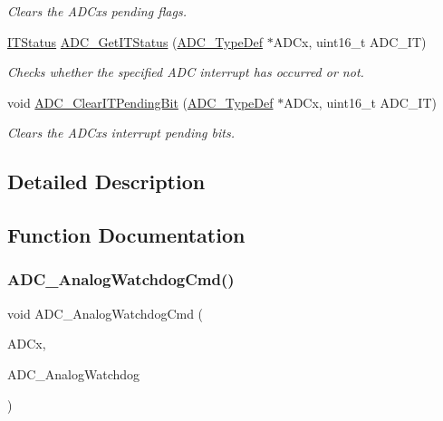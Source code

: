 \begin{DoxyCompactItemize}
\begin{DoxyCompactList}\small\item\em Clears the A\+D\+Cx\textquotesingle{}s pending flags. \end{DoxyCompactList}\item 
\hyperlink{group___exported__types_gaacbd7ed539db0aacd973a0f6eca34074}{I\+T\+Status} \hyperlink{group___a_d_c___exported___functions_gaa1d3b910a83dbf14d4f68c8eef058612}{A\+D\+C\+\_\+\+Get\+I\+T\+Status} (\hyperlink{struct_a_d_c___type_def}{A\+D\+C\+\_\+\+Type\+Def} $\ast$A\+D\+Cx, uint16\+\_\+t A\+D\+C\+\_\+\+IT)
\begin{DoxyCompactList}\small\item\em Checks whether the specified A\+DC interrupt has occurred or not. \end{DoxyCompactList}\item 
void \hyperlink{group___a_d_c___exported___functions_ga601c6a67bd883eb631ecc7aa5e999b9c}{A\+D\+C\+\_\+\+Clear\+I\+T\+Pending\+Bit} (\hyperlink{struct_a_d_c___type_def}{A\+D\+C\+\_\+\+Type\+Def} $\ast$A\+D\+Cx, uint16\+\_\+t A\+D\+C\+\_\+\+IT)
\begin{DoxyCompactList}\small\item\em Clears the A\+D\+Cx\textquotesingle{}s interrupt pending bits. \end{DoxyCompactList}\end{DoxyCompactItemize}


\subsection{Detailed Description}


\subsection{Function Documentation}
\mbox{\label{group___a_d_c___exported___functions_gad017d69bec6e497afd35ba25ea22d86e}} 
\subsubsection{\texorpdfstring{A\+D\+C\+\_\+\+Analog\+Watchdog\+Cmd()}{ADC\_AnalogWatchdogCmd()}}
{\footnotesize\ttfamily void A\+D\+C\+\_\+\+Analog\+Watchdog\+Cmd (\begin{DoxyParamCaption}\item[{\hyperlink{struct_a_d_c___type_def}{A\+D\+C\+\_\+\+Type\+Def} $\ast$}]{A\+D\+Cx,  }\item[{uint32\+\_\+t}]{A\+D\+C\+\_\+\+Analog\+Watchdog }\end{DoxyParamCaption})}



